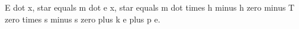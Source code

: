 E dot x, star equals m dot e x, star equals m dot times h minus h zero minus T zero times s minus s zero plus k e plus p e.